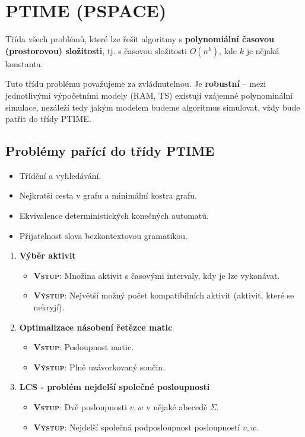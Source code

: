 \section{PTIME (PSPACE)}
Třída všech problémů, které lze řešit algoritmy s \textbf{polynomiální časovou (prostorovou) složitosti}, tj. s časovou složitosti $O (n^k)$, kde $k$ je nějaká konstanta.

Tuto třídu problému považujeme za zvládnutelnou. Je \textbf{robustní} -- mezi jednotlivými výpočetními modely (RAM, TS) existují vzájemné polynominální simulace, nezáleží tedy jakým modelem budeme algoritmus simulovat, vždy bude patřit do třídy PTIME.
\subsection{Problémy pařící do třídy PTIME}
\begin{itemize}
    \item Třídění a vyhledávání.
    \item Nejkratší cesta v grafu
          a minimální kostra grafu.
    \item Ekvivalence deterministických konečných automatů.
    \item Přijatelnost slova bezkontextovou gramatikou.
\end{itemize}


\begin{enumerate}
    \item \textbf{Výběr aktivit}
          \begin{itemize}
              \item \textbf{\textsc{Vstup}}: Množina aktivit s časovými intervaly, kdy je lze vykonávat.
              \item \textbf{\textsc{Výstup}}: Největší možný počet kompatibilních aktivit (aktivit, které se nekryjí).
          \end{itemize}
    \item \textbf{Optimalizace násobení řetězce matic}
          \begin{itemize}
              \item \textbf{\textsc{Vstup}}: Posloupnost matic.
              \item \textbf{\textsc{Výstup}}: Plně uzávorkovaný součin.
          \end{itemize}
    \item \textbf{LCS - problém nejdelší společné posloupnosti}
          \begin{itemize}
              \item \textbf{\textsc{Vstup}}: Dvě posloupnosti $v,w$ v nějaké abecedě $\Sigma$.
              \item \textbf{\textsc{Výstup}}: Nejdelší společná podposloupnost posloupností $v,w$.
          \end{itemize}
\end{enumerate}


